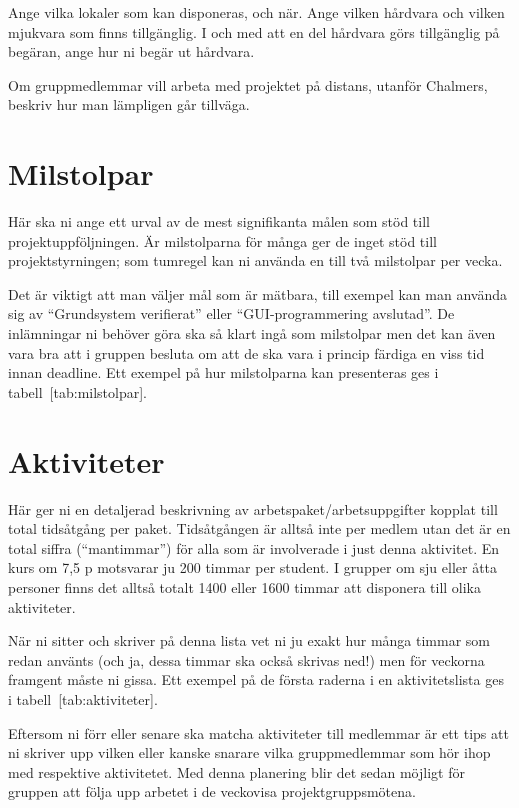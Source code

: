 \documentclass[a4paper]{article}
\begin{document}
Ange vilka lokaler som kan disponeras, och när. Ange vilken hårdvara och
vilken mjukvara som finns tillgänglig. I och med att en del hårdvara
görs tillgänglig på begäran, ange hur ni begär ut hårdvara.

Om gruppmedlemmar vill arbeta med projektet på distans, utanför
Chalmers, beskriv hur man lämpligen går tillväga.



\section {Milstolpar}


Här ska ni ange ett urval av de mest signifikanta målen som stöd till
projektuppföljningen. Är milstolparna för många ger de inget stöd till
projektstyrningen; som tumregel kan ni använda en till två milstolpar
per vecka.

Det är viktigt att man väljer mål som är mätbara, till exempel kan man
använda sig av “Grundsystem verifierat” eller “GUI-programmering
avslutad”. De inlämningar ni behöver göra ska så klart ingå som
milstolpar men det kan även vara bra att i gruppen besluta om att de ska
vara i princip färdiga en viss tid innan deadline. Ett exempel på hur
milstolparna kan presenteras ges i tabell [tab:milstolpar].

\section {Aktiviteter}

Här ger ni en detaljerad beskrivning av arbetspaket/arbetsuppgifter
kopplat till total tidsåtgång per paket. Tidsåtgången är alltså inte per
medlem utan det är en total siffra (“mantimmar”) för alla som är
involverade i just denna aktivitet. En kurs om 7,5 p motsvarar ju 200
timmar per student. I grupper om sju eller åtta personer finns det
alltså totalt 1400 eller 1600 timmar att disponera till olika
aktiviteter.

När ni sitter och skriver på denna lista vet ni ju exakt hur många
timmar som redan använts (och ja, dessa timmar ska också skrivas ned!)
men för veckorna framgent måste ni gissa. Ett exempel på de första
raderna i en aktivitetslista ges i tabell [tab:aktiviteter].


Eftersom ni förr eller senare ska matcha aktiviteter till medlemmar är
ett tips att ni skriver upp vilken eller kanske snarare vilka
gruppmedlemmar som hör ihop med respektive aktivitetet. Med denna
planering blir det sedan möjligt för gruppen att följa upp arbetet i de
veckovisa projektgruppsmötena.
\end{document}
